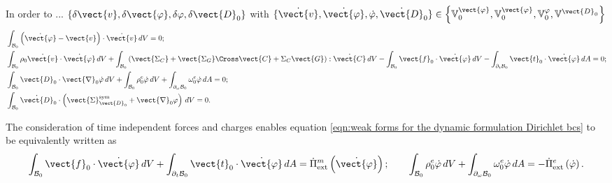 In order to ... $\{\delta\vect{v},\delta\vect{\varphi},\delta\varphi,\delta\vect{D}_0\}$ with $\{\dot{\vect{v}},\dot{\vect{\varphi}},\dot\varphi,\dot{\vect{D}}_0\}\in\left\{\mathbb{V}_0^{\vect{\varphi}},\mathbb{V}_0^{\vect{\varphi}},\mathbb{V}^{\varphi}_0,\mathbb{V}^{\vect{D}_0}\right\}$
%
\begin{equation}\label{eqn:weak forms for the dynamic formulation Dirichlet bcs}
\begin{aligned}
&\int_{\mathcal{B}_0}\left(\dot{\vect{\varphi}} - \vect{v}\right)\cdot\dot{\vect{v}}\,dV=0;\\
%
&\int_{\mathcal{B}_0}\rho_0\dot{\vect{v}}\cdot\dot{\vect{\varphi}}\,dV + \int_{\mathcal{B}_0}\left(\vect{\Sigma_C} + \vect{\Sigma_G}\Cross\vect{C} + \Sigma_C\vect{G}\right):\dot{\vect{C}}\,dV-  \int_{\mathcal{B}_0}\vect{f}_0\cdot\dot{\vect{\varphi}}\,dV-
\int_{\partial_{t}\mathcal{B}_0}\vect{t}_0\cdot\dot{\vect{\varphi}}\,dA=0 ;\\
%
&\int_{\mathcal{B}_0}\vect{D}_0\cdot\vect{\nabla}_0\dot{\varphi}\,dV+  \int_{\mathcal{B}_0}\rho_0^e\dot{\varphi}\,dV + 
\int_{\partial_{\omega}\mathcal{B}_0}\omega^e_0\dot{\varphi}\,dA=0;\\
%
&\int_{\mathcal{B}_0}\dot{\vect{D}}_0\cdot \left(\vect{\Sigma}^{\text{sym}}_{\vect{D}_0} + \vect{\nabla}_0\varphi\right)\,dV=0.
%
\end{aligned}
\end{equation}


The consideration of time independent forces and charges enables equation \eqref{eqn:weak forms for the dynamic formulation Dirichlet bcs} to be equivalently written as
%
\begin{equation}\label{eqn:DPiextr}
\begin{aligned}
\int_{\mathcal{B}_0}\vect{f}_0\cdot\dot{\vect{\varphi}}\,dV + 
\int_{\partial_t\mathcal{B}_0}\vect{t}_0\cdot\dot{\vect{\varphi}}\,dA  = \dot{\Pi}^m_{\text{ext}}\left(\dot{\vect{\varphi}}\right);\qquad
%
\int_{\mathcal{B}_0}{\rho}^e_0\dot{{\varphi}}\,dV + 
\int_{\partial_{\omega}\mathcal{B}_0}\omega^e_0\dot{\varphi}\,dA  = -\dot{\Pi}^e_{\text{ext}}\left(\dot{{\varphi}}\right).
%
\end{aligned}
\end{equation}

